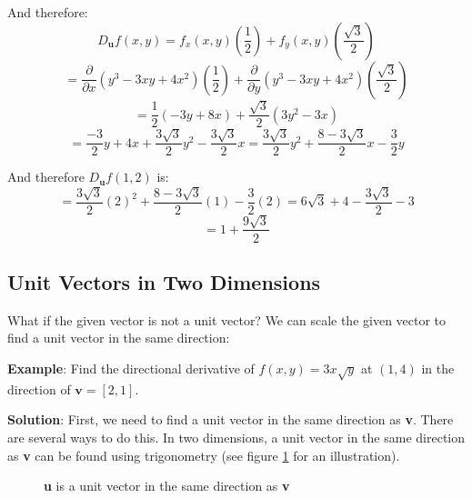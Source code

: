 And therefore:
$$D_{\textbf{u}} f(x, y) = f_x(x, y) \left( \frac{1}{2} \right) + f_y(x, y) 
\left( \frac{\sqrt{3}}{2} \right) $$
$$= \frac{\partial}{\partial x} \left( y^3 - 3xy + 4x^2 \right) \left( 
\frac{1}{2} \right) + \frac{\partial}{\partial y} \left( y^3 - 3xy + 4x^2 
\right) \left( \frac{\sqrt{3}}{2} \right)$$
$$= \frac{1}{2} \left( -3y + 8x \right) + \frac{\sqrt{3}}{2} \left( 3y^2 - 3x 
\right)$$
$$= \frac{-3}{2}y + 4x + \frac{3\sqrt{3}}{2}y^2 - \frac{3\sqrt{3}}{2}x = \frac{
3\sqrt{3}}{2}y^2 + \frac{8-3\sqrt{3}}{2}x - \frac{3}{2}y$$

And therefore $D_{\textbf{u}} f(1, 2)$ is:
$$= \frac{3\sqrt{3}}{2} \left( 2 \right)^2 + \frac{8 - 3\sqrt{3}}{2} \left( 1 
\right) - \frac{3}{2} \left( 2 \right) = 6\sqrt{3} + 4 - \frac{3\sqrt{3}}{2} - 
3$$
$$= 1 + \frac{9\sqrt{3}}{2}$$

\subsection{Unit Vectors in Two Dimensions}

What if the given vector is not a unit vector? We can scale the given vector 
to find a unit vector in the same direction:

\textbf{Example}: Find the directional derivative of $f(x, y) = 3x\sqrt{y}$ 
at $(1, 4)$ in the direction of $\textbf{v} = \left[2, 1 \right]$.

\textbf{Solution}: First, we need to find a unit vector in the same direction 
as \textbf{v}. There are several ways to do this. In two dimensions, a unit 
vector in the same direction as \textbf{v} can be found using trigonometry 
(see figure \ref{fig:vector} for an illustration). 

\begin{figure}[htbp]
    \centering
    \caption{\textbf{u} is a unit vector in the same direction as \textbf{v}}
    \label{fig:vector}
\end{figure}

